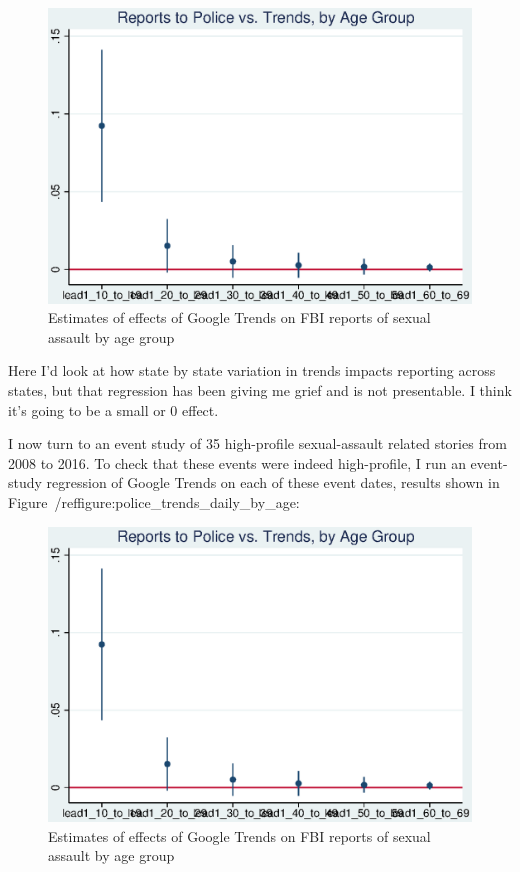 \documentclass[AER,draftmode]{AEA}
\begin{document}
\begin{figure}
\includegraphics[]{figures/police_trend_daily_agegroup.eps}
\caption{Estimates of effects of Google Trends on FBI reports of sexual assault by age group} \label{figure:police_trends_daily_by_age}
\end{figure}


Here I'd look at how state by state variation in trends impacts reporting across states, but that regression has been giving me grief and is not presentable. I think it's going to be a small or 0 effect.

I now turn to an event study of 35 high-profile sexual-assault related stories from 2008 to 2016. To check that these events were indeed high-profile, I run an event-study regression of Google Trends on each of these event dates, results shown in Figure~/ref{figure:police_trends_daily_by_age}:

\begin{figure}
\includegraphics[]{figures/police_trend_daily_agegroup.eps}
\caption{Estimates of effects of Google Trends on FBI reports of sexual assault by age group} \label{figure:police_trends_daily_by_age}
\end{figure}
\end{document}
